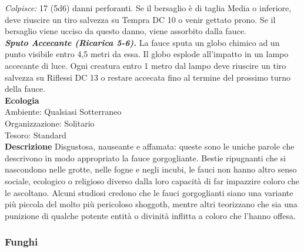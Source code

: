 \begin{multicols}{2}
\emph{Colpisce:} 17 (5d6) danni perforanti. Se il bersaglio è di taglia Media o inferiore, deve riuscire un tiro salvezza su Tempra DC 10 o venir gettato prono. Se il bersaglio viene ucciso da questo danno, viene assorbito dalla fauce.\\
\emph{\textbf{Sputo Accecante (Ricarica 5-6).}} La fauce sputa un globo chimico ad un punto visibile entro 4,5 metri da essa. Il globo esplode all'impatto in un lampo accecante di luce. Ogni creatura entro 1 metro dal lampo deve riuscire un tiro salvezza su Riflessi DC 13 o restare accecata fino al termine del prossimo turno della fauce.\\
\textbf{Ecologia}\\
Ambiente: Qualsiasi Sotterraneo\\
Organizzazione: Solitario\\
Tesoro: Standard\\
\textbf{Descrizione}
Disgustosa, nauseante e affamata: queste sono le uniche parole che descrivono in modo appropriato la fauce gorgogliante. Bestie ripugnanti che si nascondono nelle grotte, nelle fogne e negli incubi, le fauci non hanno altro senso sociale, ecologico o religioso diverso dalla loro capacità di far impazzire coloro che le ascoltano. Alcuni studiosi credono che le fauci gorgoglianti siano una variante più piccola del molto più pericoloso shoggoth, mentre altri teorizzano che sia una punizione di qualche potente entità o divinità inflitta a coloro che l’hanno offesa.\\


\subsubsection{Funghi}


\end{multicols}
